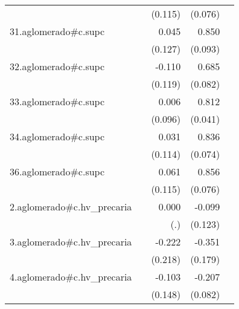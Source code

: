 {\begin{longtable}{l*{4}{D{.}{.}{-1}}}
            &                     &     (0.115)         &     (0.076)         &                     \\
\addlinespace
31.aglomerado#c.supc&                     &       0.045         &       0.850\sym{***}&                     \\
            &                     &     (0.127)         &     (0.093)         &                     \\
\addlinespace
32.aglomerado#c.supc&                     &      -0.110         &       0.685\sym{***}&                     \\
            &                     &     (0.119)         &     (0.082)         &                     \\
\addlinespace
33.aglomerado#c.supc&                     &       0.006         &       0.812\sym{***}&                     \\
            &                     &     (0.096)         &     (0.041)         &                     \\
\addlinespace
34.aglomerado#c.supc&                     &       0.031         &       0.836\sym{***}&                     \\
            &                     &     (0.114)         &     (0.074)         &                     \\
\addlinespace
36.aglomerado#c.supc&                     &       0.061         &       0.856\sym{***}&                     \\
            &                     &     (0.115)         &     (0.076)         &                     \\
\addlinespace
2.aglomerado#c.hv\_precaria&                     &       0.000         &      -0.099         &                     \\
            &                     &         (.)         &     (0.123)         &                     \\
\addlinespace
3.aglomerado#c.hv\_precaria&                     &      -0.222         &      -0.351         &                     \\
            &                     &     (0.218)         &     (0.179)         &                     \\
\addlinespace
4.aglomerado#c.hv\_precaria&                     &      -0.103         &      -0.207\sym{*}  &                     \\
            &                     &     (0.148)         &     (0.082)         &                     \\

\end{longtable}}
